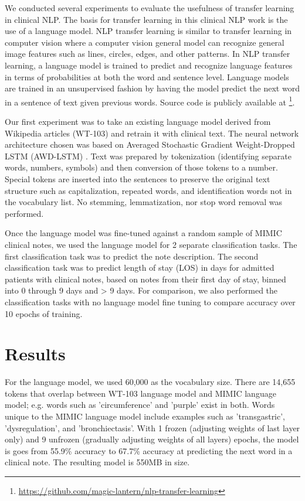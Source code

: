 \documentclass{amia}
\begin{document}
We conducted several experiments to evaluate the usefulness of transfer learning in clinical NLP. The basis for transfer learning in this clinical NLP work is the use of a language model. NLP transfer learning is similar to transfer learning in computer vision where a computer vision general model can recognize general image features such as lines, circles, edges, and other patterns. In NLP transfer learning, a language model is trained to predict and recognize language features in terms of probabilities at both the word and sentence level. Language models are trained in an unsupervised fashion by having the model predict the next word in a sentence of text given previous words. Source code is publicly available at \footnote{\url{https://github.com/magic-lantern/nlp-transfer-learning}}.

Our first experiment was to take an existing language model derived from Wikipedia articles (WT-103) \cite{Merity2016Sep} and retrain it with clinical text. The neural network architecture chosen was based on Averaged Stochastic Gradient Weight-Dropped LSTM (AWD-LSTM) \cite{Merity2017Aug}. Text was prepared by tokenization (identifying separate words, numbers, symbols) and then conversion of those tokens to a number. Special tokens are inserted into the sentences to preserve the original text structure such as capitalization, repeated words, and identification words not in the vocabulary list. No stemming, lemmatization, nor stop word removal was performed.

Once the language model was fine-tuned against a random sample of MIMIC clinical notes, we used the language model for 2 separate classification tasks. The first classification task was to predict the note description. The second classification task was to predict length of stay (LOS) in days for admitted patients with clinical notes, based on notes from their first day of stay, binned into 0 through 9 days and > 9 days. For comparison, we also performed the classification tasks with no language model fine tuning to compare accuracy over 10 epochs of training.

\section*{Results}

For the language model, we used 60,000 as the vocabulary size. There are 14,655 tokens that overlap between WT-103 language model and MIMIC language model; e.g. words such as 'circumference' and 'purple' exist in both. Words unique to the MIMIC language model include examples such as 'transgastric', 'dysregulation', and 'bronchiectasis'. With 1 frozen (adjusting weights of last layer only) and 9 unfrozen (gradually adjusting weights of all layers) epochs, the model is goes from 55.9\% accuracy to 67.7\% accuracy at predicting the next word in a clinical note. The resulting model is 550MB in size.
\end{document}
